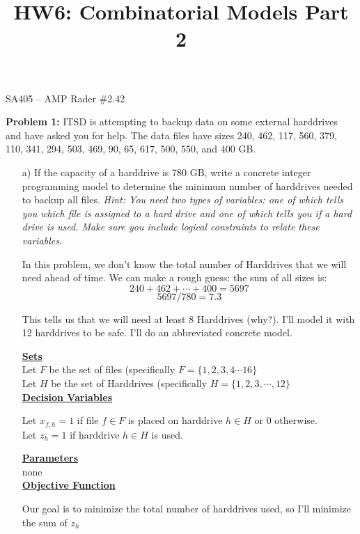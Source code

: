 \documentclass[11pt]{article}
\makeatletter
\theoremstyle{definition}
\newcommand{\blu}{\color{blue}}
\renewcommand{\maketitle}{
  \noindent SA405 -- AMP \hfill Rader \#2.42 \\

  \begin{center}\Large{\textbf{\@title}}\end{center}
}
\makeatother
\begin{document}
  
\title{HW6: Combinatorial Models Part 2}


\maketitle

% 

\textbf{Problem 1:} ITSD is attempting to backup data on some external harddrives and have asked you for help. The data files have sizes 240, 462, 117, 560, 379, 110, 341, 294, 503, 469, 90, 65, 617, 500, 550, and 400 GB.
\begin{enumerate}
\item[a)] If the capacity of a harddrive is 780 GB, write a concrete integer programming model to determine the minimum number of harddrives needed to backup all files. \emph{Hint: You need two types of variables: one of which tells you which file is assigned to a hard drive and one of which tells you if a hard drive is used. Make sure you include logical constraints to relate these variables}.

{
\blu

In this problem, we don't know the total number of Harddrives that we will need ahead of time. We can make a rough guess: the sum of all sizes is:
\[
240+462+\cdots + 400 = 5697 
\]
\[
5697 / 780 = 7.3
\]

This tells us that we will need at least 8 Harddrives (why?). I'll model it with 12 harddrives to be safe. I'll do an abbreviated concrete model.

\textbf{\underline{Sets}} \\

Let $F$ be the set of files (specifically $F = \{1, 2, 3, 4 \cdots 16\}$ \\
Let $H$ be the set of Harddrives (specifically $H = \{1, 2, 3 , \cdots, 12 \}$ \\


\textbf{\underline{Decision Variables}}

Let $x_{f,h} = 1$ if file $f \in F$ is placed on harddrive $h \in H$ or $0$ otherwise. \\
Let $z_h = 1$ if harddrive $h \in H$ is used.

\textbf{\underline{Parameters}} \\
none \\

\textbf{\underline{Objective Function}}

Our goal is to minimize the total number of harddrives used, so I'll minimize the sum of $z_h$

}
\end{enumerate}
\end{document}
